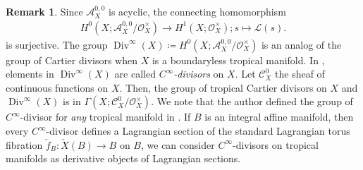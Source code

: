 \documentclass[a4paper,dvipdfmx,reqno,12pt]{amsart}
\theoremstyle{definition}
\newtheorem{remark}[theorem]{Remark}
\newcommand{\deq}{\coloneqq}
\newcommand{\opn}[1]{\operatorname{#1}}
\numberwithin{equation}{section}
\begin{document}
\begin{remark}
Since $\mathcal{A}^{0,0}_X$ is acyclic,
the connecting homomorphism
\begin{align}
H^{0}(X;\mathcal{A}^{0,0}_X/\mathcal{O}_X^{\times})
\to H^{1}(X;\mathcal{O}_X^{\times}); s\mapsto \mathcal{L}(s).
\end{align}
is surjective. The group 
$\opn{Div}^{\infty}(X)\deq 
H^{0}(X;\mathcal{A}^{0,0}_X/\mathcal{O}_X^{\times})$
is an analog of the group of Cartier divisors
when $X$ is a boundaryless tropical manifold.
In \cite{tsutsui2023graded}, elements 
in $\opn{Div}^{\infty}(X)$ are called 
\emph{$C^{\infty}$-divisors} on $X$.
Let $\mathcal{C}^{0}_X$ the sheaf of continuous functions
on $X$. Then, the group of tropical Cartier divisors on
$X$ and $\opn{Div}^{\infty}(X)$ is in 
$\Gamma (X;\mathcal{C}^{0}_X/\mathcal{O}_X^{\times})$.
We note that the author 
defined the group of $C^{\infty}$-divisor for \emph{any}
tropical manifold in \cite{tsutsui2023graded}.
If $B$ is an integral affine manifold,
then every $C^{\infty}$-divisor defines
a Lagrangian section of the standard Lagrangian
torus fibration $\check{f}_B\colon \check{X}(B)\to B$
on $B$, we can consider $C^{\infty}$-divisors on
tropical manifolds as derivative objects
of Lagrangian sections.


\end{remark}
\end{document}
